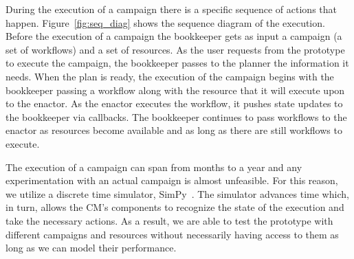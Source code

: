 During the execution of a campaign there is a specific sequence of actions that happen.
Figure~\ref{fig:seq_diag} shows the sequence diagram of the execution.
Before the execution of a campaign the bookkeeper gets as input a campaign (a set of workflows) and a set of resources.
As the user requests from the prototype to execute the campaign, the bookkeeper passes to the planner the information it needs.
When the plan is ready, the execution of the campaign begins with the bookkeeper passing a workflow along with the resource that it will execute upon to the enactor.
As the enactor executes the workflow, it pushes state updates to the bookkeeper via callbacks.
The bookkeeper continues to pass workflows to the enactor as resources become available and as long as there are still workflows to execute.

The execution of a campaign can span from months to a year and any experimentation with an actual campaign is almost unfeasible.
For this reason, we utilize a discrete time simulator, SimPy~\cite{simpy}.
The simulator advances time which, in turn, allows the CM's components to recognize the state of the execution and take the necessary actions.
As a result, we are able to test the prototype with different campaigns and resources without necessarily having access to them as long as we can model their performance.

